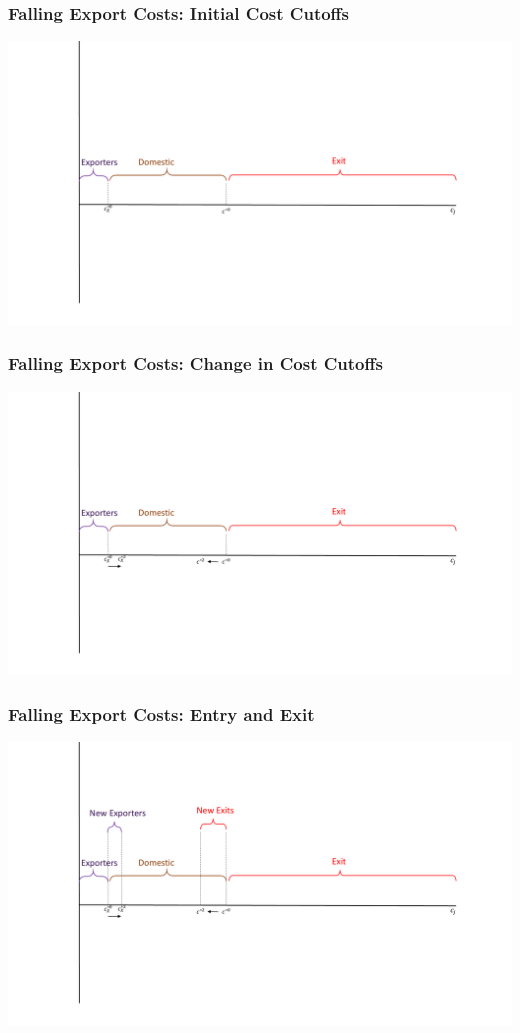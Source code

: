 \documentclass{beamer}
\begin{document}
\begin{frame}
	\frametitle{Falling Export Costs: Initial Cost Cutoffs}
	\includegraphics[scale=0.32]{SL4_27.pdf}
	
\end{frame}

\begin{frame}
	\frametitle{Falling Export Costs: Change in Cost Cutoffs}
	\includegraphics[scale=0.32]{SL4_28.pdf}
	
\end{frame}

\begin{frame}
	\frametitle{Falling Export Costs: Entry and Exit}
	\includegraphics[scale=0.32]{SL4_29.pdf}
	
\end{frame}
\end{document}
